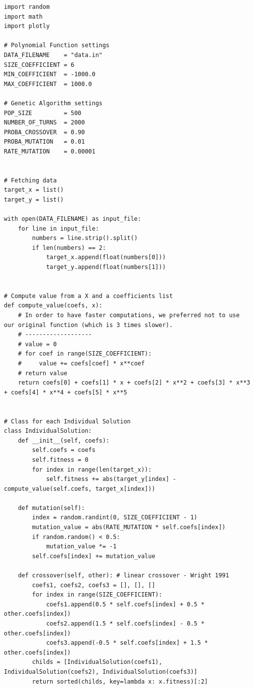 \documentclass[12pt]{article}
\begin{document}
\begin{lstlisting}[frame=single,caption=Compute of the fitness value]
import random
import math
import plotly

# Polynomial Function settings
DATA_FILENAME    = "data.in"
SIZE_COEFFICIENT = 6
MIN_COEFFICIENT  = -1000.0
MAX_COEFFICIENT  = 1000.0

# Genetic Algorithm settings
POP_SIZE         = 500
NUMBER_OF_TURNS  = 2000
PROBA_CROSSOVER  = 0.90
PROBA_MUTATION   = 0.01
RATE_MUTATION    = 0.00001


# Fetching data
target_x = list()
target_y = list()

with open(DATA_FILENAME) as input_file:
    for line in input_file:
        numbers = line.strip().split()
        if len(numbers) == 2:
            target_x.append(float(numbers[0]))
            target_y.append(float(numbers[1]))


# Compute value from a X and a coefficients list
def compute_value(coefs, x):
    # In order to have faster computations, we preferred not to use our original function (which is 3 times slower).
    # -------------------
    # value = 0
    # for coef in range(SIZE_COEFFICIENT):
    #     value += coefs[coef] * x**coef
    # return value
    return coefs[0] + coefs[1] * x + coefs[2] * x**2 + coefs[3] * x**3 + coefs[4] * x**4 + coefs[5] * x**5


# Class for each Individual Solution
class IndividualSolution:
    def __init__(self, coefs):
        self.coefs = coefs
        self.fitness = 0
        for index in range(len(target_x)):
            self.fitness += abs(target_y[index] - compute_value(self.coefs, target_x[index]))

    def mutation(self):
        index = random.randint(0, SIZE_COEFFICIENT - 1)
        mutation_value = abs(RATE_MUTATION * self.coefs[index])
        if random.random() < 0.5:
            mutation_value *= -1
        self.coefs[index] += mutation_value

    def crossover(self, other): # linear crossover - Wright 1991
        coefs1, coefs2, coefs3 = [], [], []
        for index in range(SIZE_COEFFICIENT):
            coefs1.append(0.5 * self.coefs[index] + 0.5 * other.coefs[index])
            coefs2.append(1.5 * self.coefs[index] - 0.5 * other.coefs[index])
            coefs3.append(-0.5 * self.coefs[index] + 1.5 * other.coefs[index])
        childs = [IndividualSolution(coefs1), IndividualSolution(coefs2), IndividualSolution(coefs3)]
        return sorted(childs, key=lambda x: x.fitness)[:2]



\end{lstlisting}
\end{document}
